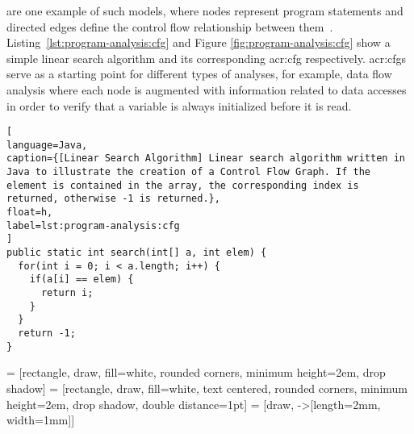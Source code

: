 \textit{} are one example of such models, where nodes represent program statements and directed edges define the control flow relationship between them~\cite{Allen1970}. Listing~\ref{lst:program-analysis:cfg} and Figure \ref{fig:program-analysis:cfg} show a simple linear search algorithm and its corresponding \acrlong{acr:cfg} respectively. \acrshort{acr:cfg}s serve as a starting point for different types of analyses, for example, data flow analysis where each node is augmented with information related to data accesses in order to verify that a variable is always initialized before it is read. 

\begin{lstlisting}[
language=Java,
caption={[Linear Search Algorithm] Linear search algorithm written in Java to illustrate the creation of a Control Flow Graph. If the element is contained in the array, the corresponding index is returned, otherwise -1 is returned.},
float=h,
label=lst:program-analysis:cfg
]
public static int search(int[] a, int elem) {
  for(int i = 0; i < a.length; i++) {
    if(a[i] == elem) {
      return i;
    }
  }
  return -1;
}
\end{lstlisting}

 = [rectangle, draw, fill=white, rounded corners, minimum height=2em, drop shadow]
 = [rectangle, draw, fill=white, text centered, rounded corners, minimum height=2em, drop shadow, double distance=1pt]
 = [draw, -{>[length=2mm, width=1mm]}]

